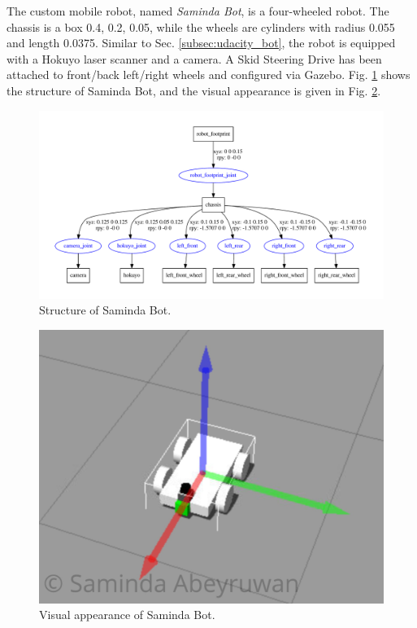 \documentclass[10pt,journal,compsoc]{IEEEtran}
\begin{document}
The custom mobile robot, named \textit{Saminda Bot}, is a four-wheeled robot. The chassis is a box 0.4, 0.2, 0.05, while the wheels are cylinders with radius 0.055 and length 0.0375. Similar to Sec. \ref{subsec:udacity_bot}, the robot is equipped with a Hokuyo laser scanner and a camera. A Skid Steering Drive has been attached to front/back left/right wheels and configured via Gazebo. Fig. \ref{fig:saminda_bot} shows the structure of Saminda Bot, and the visual appearance is given in Fig.  \ref{fig:sb}.

\begin{figure}[thpb]
      \centering
      \includegraphics[width=\linewidth]{misc/saminda_bot.pdf}
      \caption{Structure of Saminda Bot.}
      \label{fig:saminda_bot}
\end{figure}

\begin{figure}[thpb]
      \centering
      \includegraphics[width=\linewidth]{misc/sb_w.png}
      \caption{Visual appearance of Saminda Bot.}
      \label{fig:sb}
\end{figure}
\end{document}
